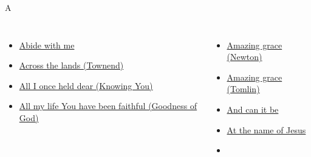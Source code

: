 \documentclass{beamer}
\begin{document}
\begin{frame}[t]{A}
\begin{columns}[t]
        \begin{itemize}
    \item \hyperlink{Abide with me[]}{Abide with me } \phantom{ 1 1 1 1 1 1 1 1 1 1 1}
    \item \hyperlink{Across the lands["You're the Word of God the Father"](Townend)}{Across the lands (Townend)} \phantom{ 1 1 1 1 1}
    \item \hyperlink{Knowing You['All I once held dear']}{All I once held dear (Knowing You)} \phantom{ 1}
    \item \hyperlink{Goodness of God['All my life You have been faithful']}{All my life You have been faithful (Goodness of God)} \phantom{}
\end{itemize}
        \begin{itemize}
            \item \hyperlink{Amazing grace[](Newton)}{Amazing grace (Newton)} \phantom{ 1 1 1 1 1 1 1}
                                            \item \hyperlink{Amazing grace['My chains are gone'](Tomlin)}{Amazing grace (Tomlin)} \phantom{ 1 1 1 1 1 1 1}
            \item \hyperlink{And can it be[]}{And can it be } \phantom{ 1 1 1 1 1 1 1 1 1 1 1}
    \item \hyperlink{At the name of Jesus[]}{At the name of Jesus } \phantom{ 1 1 1 1 1 1 1}
    \item[] \phantom{1}\end{itemize}


\end{columns}

\end{frame}
\end{document}
